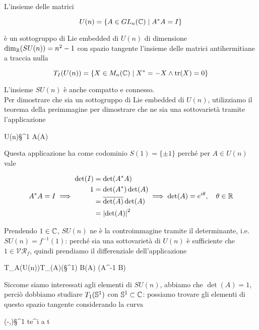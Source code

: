 L'insieme delle matrici

\begin{equation}
	U(n) = \{ A \in GL_{n}(\C) \mid A^{*} A = I \}
\end{equation}

è un sottogruppo di Lie embedded di $ U(n) $ di dimensione $ \dim_{\R}(SU(n)) = n^{2} - 1 $ con spazio tangente l'insieme delle matrici antihermitiane a traccia nulla

\begin{equation}
	T_{I}(U(n)) = \{ X \in M_{n}(\C) \mid X^{*} = -X \wedge \tr(X) = 0 \}
\end{equation}

L'insieme $ SU(n) $ è anche compatto e connesso.\\
Per dimostrare che sia un sottogruppo di Lie embedded di $ U(n) $, utilizziamo il teorema della preimmagine per dimostrare che ne sia una sottovarietà tramite l'applicazione

%
	{U(n)}{\S^{1}}%
	{A}{\det(A)}

Questa applicazione ha come codominio $ S(1) = \{ \pm 1 \} $ perché per $ A \in U(n) $ vale

\begin{equation}
	A^{*} A = I \implies %
	\begin{aligned}
		\det(I) &= \det(A^{*} A)\\
		1 &= \det(A^{*}) \det(A)\\
		&= \overline{\det(A)} \det(A)\\
		&= \abs{\det(A)}^{2}
	\end{aligned}%
	\implies %
	\det(A) = e^{i \theta} \qcomma \theta \in \R
\end{equation}

Prendendo $ 1 \in \C $, $ SU(n) $ ne è la controimmagine tramite il determinante, i.e. $ SU(n) = f^{-1}(1) $: perché sia una sottovarietà di $ U(n) $ è sufficiente che $ 1 \in \mathcal{VR}_{f} $, quindi prendiamo il differenziale dell'applicazione 

%
	{T_{A}(U(n))}{T_{\det(A)}(\S^{1})}%
	{B}{\det(A) \tr(A^{-1} B)}
	
Siccome siamo interessati agli elementi di $ SU(n) $, abbiamo che $ \det(A) = 1 $, perciò dobbiamo studiare $ T_{1}(\S^{1}) $ con $ \S^{1} \subset \C $: possiamo trovare gli elementi di questo spazio tangente considerando la curva

%
	{(-\varepsilon,\varepsilon)}{\S^{1}}%
	{t}{e^{i a t}}
	
